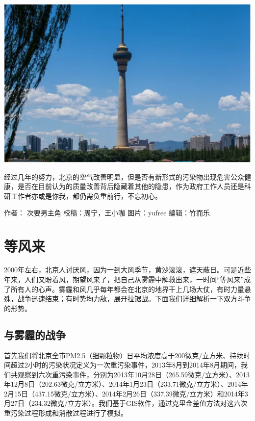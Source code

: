 \documentclass[
]{book}
\begin{document}
\includegraphics[width=8.33in]{images/air5}

经过几年的努力，北京的空气改善明显，但是否有新形式的污染物出现危害公众健康，是否在目前认为的质量改善背后隐藏着其他的隐患，作为政府工作人员还是科研工作者亦或是你我，都仍需负重前行，不忘初心。

作者： 次要男主角
校稿：周宁，王小咖
图片：yufree
编辑：竹而乐

\hypertarget{ux7b49ux98ceux6765}{%
\section{等风来}\label{ux7b49ux98ceux6765}}

2000年左右，北京人讨厌风，因为一到大风季节，黄沙滚滚，遮天蔽日。可是近些年来，人们又盼着风，期望风来了，把自己从雾霾中解救出来，一时间``等风来''成了所有人的心声。雾霾和风几乎每年都会在北京的地界干上几场大仗，有时力量悬殊，战争迅速结束；有时势均力敌，展开拉锯战。下面我们详细解析一下双方斗争的形势。

\hypertarget{ux4e0eux96feux973eux7684ux6218ux4e89}{%
\subsection{与雾霾的战争}\label{ux4e0eux96feux973eux7684ux6218ux4e89}}

首先我们将北京全市PM2.5（细颗粒物）日平均浓度高于200微克/立方米、持续时间超过2小时的污染状况定义为一次重污染事件，2013年8月到2014年8月期间，我们共观察到六次重污染事件，分别为2013年10月28日（265.59微克/立方米）、2013年12月8日（202.63微克/立方米）、2014年1月23日（233.71微克/立方米）、2014年2月15日（437.15微克/立方米）、2014年2月26日（337.39微克/立方米）和2014年3月27日（234.32微克/立方米）。我们基于GIS软件，通过克里金差值方法对这六次重污染过程形成和消散过程进行了模拟。
\end{document}

